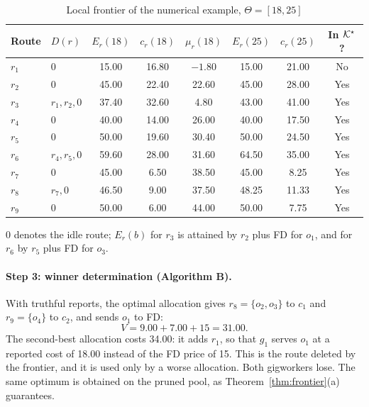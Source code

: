 \begin{table}[t]
\centering
\caption{Local frontier of the numerical example, $\Theta=[18,25]$}
\label{tab:ex-frontier}
\small
\begin{tabular}{llcccccc}
\toprule
Route & $D(r)$ & $E_r(18)$ & $c_r(18)$ & $\mu_r(18)$ & $E_r(25)$ & $c_r(25)$ & In $\mathcal{K}^\star$?\\
\midrule
$r_1$ & $0$ & 15.00 & 16.80 & $-1.80$ & 15.00 & 21.00 & No\\
$r_2$ & $0$ & 45.00 & 22.40 & 22.60 & 45.00 & 28.00 & Yes\\
$r_3$ & $r_1,r_2,0$ & 37.40 & 32.60 & 4.80 & 43.00 & 41.00 & Yes\\
$r_4$ & $0$ & 40.00 & 14.00 & 26.00 & 40.00 & 17.50 & Yes\\
$r_5$ & $0$ & 50.00 & 19.60 & 30.40 & 50.00 & 24.50 & Yes\\
$r_6$ & $r_4,r_5,0$ & 59.60 & 28.00 & 31.60 & 64.50 & 35.00 & Yes\\
$r_7$ & $0$ & 45.00 & 6.50 & 38.50 & 45.00 & 8.25 & Yes\\
$r_8$ & $r_7,0$ & 46.50 & 9.00 & 37.50 & 48.25 & 11.33 & Yes\\
$r_9$ & $0$ & 50.00 & 6.00 & 44.00 & 50.00 & 7.75 & Yes\\
\bottomrule
\end{tabular}
\par\smallskip\footnotesize $0$ denotes the idle route; $E_r(b)$ for $r_3$ is attained by $r_2$ plus FD for $o_1$, and for $r_6$ by $r_5$ plus FD for $o_3$.
\end{table}

\paragraph{Step 3: winner determination (Algorithm B).} With truthful
reports, the optimal allocation gives $r_8=\{o_2,o_3\}$ to $c_1$ and
$r_9=\{o_4\}$ to $c_2$, and sends $o_1$ to FD:
\[
V=9.00+7.00+15=31.00 .
\]
The second-best allocation costs 34.00: it adds $r_1$, so that $g_1$ serves
$o_1$ at a reported cost of 18.00 instead of the FD price of 15. This is the
route deleted by the frontier, and it is used only by a worse allocation.
Both gigworkers lose. The same optimum is obtained on the pruned pool, as
Theorem~\ref{thm:frontier}(a) guarantees.

